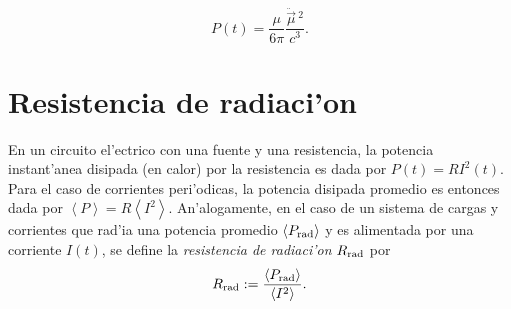 \begin{equation}\label{Pdipmag}
\boxed{P(t)=\frac{\mu}{6\pi}\frac{\ddot{\vec{\mu}}{\,}^2}{c^3}.}
\end{equation}

\section{Resistencia de radiaci'on}

En un circuito el'ectrico con una fuente y una resistencia, la potencia instant'anea disipada (en calor) por la resistencia es dada por $P(t)=RI^2(t)$. Para el caso de corrientes peri'odicas, la potencia disipada promedio es entonces dada por $\left\langle P\right\rangle=R\left\langle I^2\right\rangle$.
An'alogamente, en el caso de un sistema de cargas y corrientes que rad'ia una potencia promedio $\left\langle P_{\rm rad}\right\rangle$ y es alimentada por una corriente $I(t)$, se define la \textit{resistencia de radiaci'on} $R_{\rm rad}$ por
\begin{equation}
R_{\rm rad}:=\frac{\left\langle P_{\rm rad}\right\rangle}{\left\langle I^2\right\rangle}.
\end{equation}

